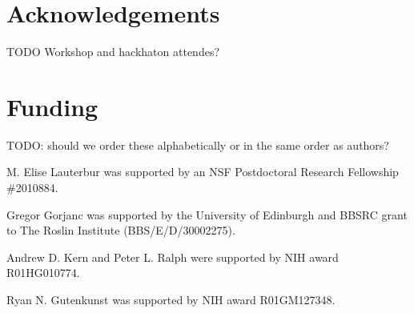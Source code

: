 \documentclass[hidelinks]{article}
\begin{document}
\hypertarget{acknowledgements}{%
\section*{Acknowledgements}\label{acknowledgements}}

TODO Workshop and hackhaton attendes?

\hypertarget{funding}{%
\section*{Funding}\label{funding}}

TODO: should we order these alphabetically or in the same order as authors?

M. Elise Lauterbur was supported by an NSF Postdoctoral Research Fellowship \#2010884.

Gregor Gorjanc was supported by the University of Edinburgh and BBSRC grant to The Roslin Institute (BBS/E/D/30002275).

Andrew D. Kern and Peter L. Ralph were supported by NIH award R01HG010774.

Ryan N. Gutenkunst was supported by NIH award R01GM127348.


\end{document}
